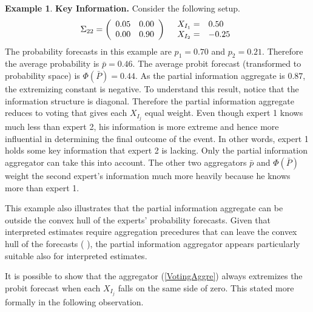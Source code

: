 \documentclass[11pt,twoside]{article}
\theoremstyle{definition}
\newtheorem{example}[theorem]{Example}
\theoremstyle{definition}
\begin{document}
\begin{example}
\textbf{Key Information.} Consider the following setup.
\begin{align*}
\Sigma_{22} =  \left(\begin{array}{c c}
0.05 & 0.00\\
0.00 & 0.90 \\
 \end{array}\right)
  && 
  \begin{array}{l l}
X_{I_1} =& 0.50\\
X_{I_2} =& -0.25
 \end{array}
\end{align*}
The probability forecasts in this example are $p_1 = 0.70$ and $p_2 = 0.21$.  Therefore the average probability is $\bar{p} = 0.46$. The average probit forecast (transformed to probability space) is $\Phi(\bar{P}) = 0.44$.  As the partial information aggregate is $0.87$,  the extremizing constant is negative. To understand this result, notice that the information structure is diagonal. Therefore the partial information aggregate reduces to voting that gives each $X_{I_j}$ equal weight. Even though expert 1 knows much less than expert 2, his information is more extreme and hence more influential in determining the final outcome of the event. In other words, expert 1 holds some key information that expert 2 is lacking. Only the partial information aggregator can take this into account. The other two aggregators $\bar{p}$ and $\Phi(\bar{P})$ weight the second expert's information much more heavily because he knows more than expert 1.

This example also illustrates that the partial information aggregate can be outside the convex hull of the experts' probability forecasts. Given that interpreted estimates require aggregation precedures that can leave the convex hull of the forecasts (\cite{parunak2013characterizing} ), the partial information aggregator appears particularly suitable also for interpreted estimates.
\end{example}
It is possible to show that the aggregator (\ref{VotingAggre}) always extremizes the probit forecast when each $X_{I_j}$ falls on the same side of zero. This stated more formally in the following observation.
 
\end{document}
